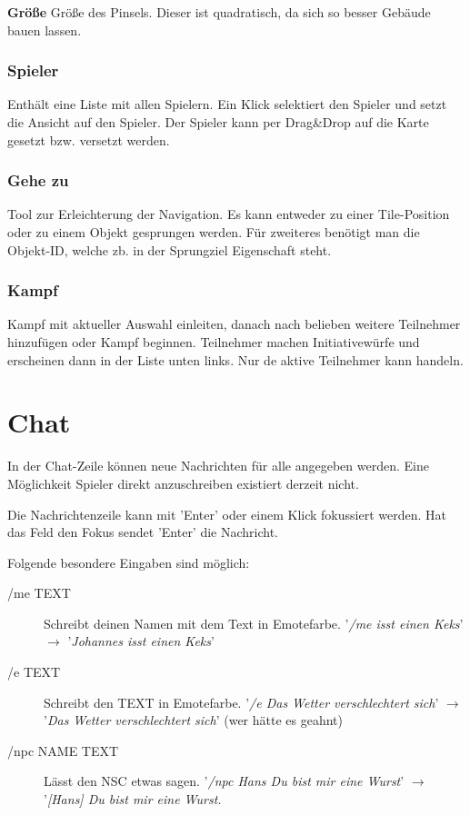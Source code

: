 \documentclass[german,10pt,a4paper,twocolumn,colorscheme=darkblue]{orarticle}
\begin{document}
			\textbf{Größe} Größe des Pinsels. Dieser ist quadratisch, da sich so besser Gebäude bauen lassen.
		
		\subsubsection*{Spieler}
			Enthält eine Liste mit allen Spielern. Ein Klick selektiert den Spieler und setzt die Ansicht auf den Spieler. Der Spieler kann per Drag\&Drop auf die Karte gesetzt bzw. versetzt werden.
		\subsubsection*{Gehe zu}
			Tool zur Erleichterung der Navigation. Es kann entweder zu einer Tile-Position oder zu einem Objekt gesprungen werden. Für zweiteres benötigt man die Objekt-ID, welche zb. in der Sprungziel Eigenschaft steht.
		\subsubsection*{Kampf}
			Kampf mit aktueller Auswahl einleiten, danach nach belieben weitere Teilnehmer hinzufügen oder Kampf beginnen. Teilnehmer machen Initiativewürfe und erscheinen dann in der Liste unten links. Nur de aktive Teilnehmer kann handeln.
		
	\section{Chat}
		In der Chat-Zeile können neue Nachrichten für alle angegeben werden. Eine Möglichkeit Spieler direkt anzuschreiben existiert derzeit nicht.
		
		Die Nachrichtenzeile kann mit 'Enter' oder einem Klick fokussiert werden. Hat das Feld den Fokus sendet 'Enter' die Nachricht.
		
		Folgende besondere Eingaben sind möglich:
		\begin{description}
		\item[/me TEXT] Schreibt deinen Namen mit dem Text in Emotefarbe. '\textit{/me isst einen Keks}' $\rightarrow$ '\textit{Johannes isst einen Keks}'
		\item[/e TEXT] Schreibt den TEXT in Emotefarbe. '\textit{/e Das Wetter verschlechtert sich}' $\rightarrow$ '\textit{Das Wetter verschlechtert sich}' (wer hätte es geahnt)
		 \item[/npc NAME TEXT] Lässt den NSC etwas sagen. '\textit{/npc Hans Du bist mir eine Wurst}' $\rightarrow$ '\textit{[Hans] Du bist mir eine Wurst.}
		\end{description}
	
\end{document}
